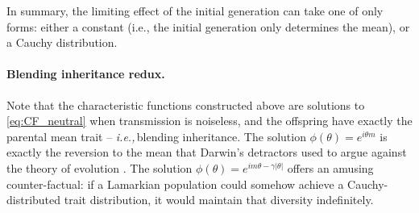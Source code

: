 \documentclass{article}
\newcommand{\E}{\mathbb{E}}
\newcommand{\ie}{\textit{i.e.,}\,}
\newcommand{\1}{\mathbbm{1}}
\DeclareMathOperator*{\re}{Re}
\theoremstyle{remark}
\theoremstyle{definition}
\begin{document}
In summary, the limiting effect of the initial generation can take one of only forms:
either a constant (i.e., the initial generation only determines the mean),
or a Cauchy distribution.


\paragraph{Blending inheritance redux.} 
Note that the characteristic functions constructed above are solutions to \eqref{eq:CF_neutral} when transmission is noiseless, and the offspring have exactly the parental mean trait -- \ie blending inheritance.  The solution $\phi(\theta) = e^{i\theta m}$ is exactly the reversion to the mean that Darwin's detractors used to argue against the theory of evolution \citep{jenkin1867,Provine1971}.  The solution $\phi(\theta) = e^{im \theta -\gamma|\theta|}$ offers an amusing counter-factual: if a Lamarkian population could somehow achieve a Cauchy-distributed trait distribution, it would maintain that diversity indefinitely.  
\end{document}
